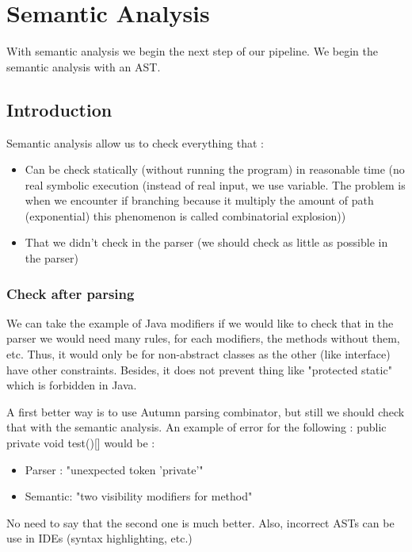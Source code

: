 \chapter{Semantic Analysis}
\label{chap:semantic_analysis}

With semantic analysis we begin the next step of our pipeline. We begin the
semantic analysis with an AST.

\section{Introduction}
    Semantic analysis allow us to check everything that :
    \begin{itemize}
        \item Can be check statically (without running the program) in
        reasonable time (no real symbolic execution (instead of real input, we
        use variable. The problem is when we encounter if branching because it
        multiply the amount of path (exponential) this phenomenon is called
        combinatorial explosion))
        \item That we didn't check in the parser (we should check as little as
        possible in the parser)
    \end{itemize}
    \subsection{Check after parsing}
        We can take the example of Java modifiers if we would like to check that
        in the parser we would need many rules, for each modifiers, the methods
        without them, etc. Thus, it would only be for non-abstract classes as
        the other (like interface) have other constraints. Besides, it does not
        prevent thing like "protected static" which is forbidden in Java.

        A first better way is to use Autumn parsing combinator, but still we
        should check that with the semantic analysis. An example of error for
        the following : public private void test()[] would be : 
        \begin{itemize}
            \item Parser : "unexpected token 'private'"
            \item Semantic: "two visibility modifiers for method"
        \end{itemize}
        No need to say that the second one is much better. Also, incorrect ASTs
        can be use in IDEs (syntax highlighting, etc.)
